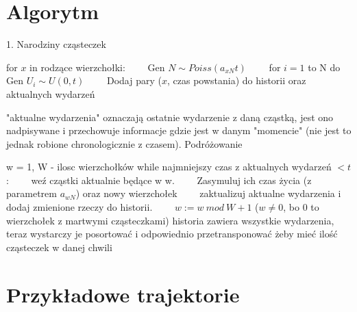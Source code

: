 \documentclass{article}
\begin{document}
\section{Algorytm}
1. Narodziny cząsteczek
\begin{algorithmic}
\State for $x$ in rodzące wierzchołki:
\State \ \ \ \ Gen $N \sim \textit{Poiss}(a_{xN}t)$
\State \ \ \ \ for $i = 1$ to N do Gen $U_i \sim U(0, t)$
\State \ \ \ \ Dodaj pary ($x$, czas powstania) do historii oraz aktualnych wydarzeń
\end{algorithmic} 
"aktualne wydarzenia" oznaczają ostatnie wydarzenie z daną cząstką, jest ono nadpisywane i przechowuje informacje gdzie jest w danym "momencie" (nie jest to jednak robione chronologicznie z czasem). Podróżowanie
\begin{algorithmic}
\State w = 1, W - ilosc wierzchołków
\State while najmniejszy czas z aktualnych wydarzeń $< t$:
\State \ \ \ \ weź cząstki aktualnie będące w w.
\State \ \ \ \ Zasymuluj ich czas życia (z parametrem $a_{wN}$) oraz nowy wierzchołek
\State \ \ \ \ zaktualizuj aktualne wydarzenia i dodaj zmienione rzeczy do historii.
\State \ \ \ \ $w := w\ mod\  W + 1$ ($w \neq 0$, bo 0 to wierzchołek z martwymi cząsteczkami)
\State historia zawiera wszystkie wydarzenia, teraz wystarczy je posortować i odpowiednio przetransponować żeby mieć ilość cząsteczek w danej chwili
\end{algorithmic} 


\section{Przykładowe trajektorie}
\end{document}

